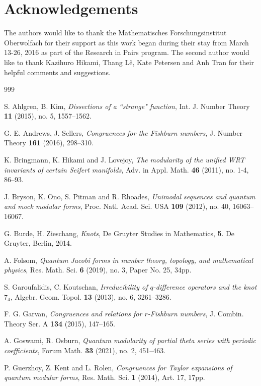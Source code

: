 \documentclass[11pt,reqno]{amsart}
\theoremstyle{definition}
\numberwithin{equation}{section}
\begin{document}
\section*{Acknowledgements}
The authors would like to thank the Mathematisches Forschungsinstitut Oberwolfach for their support as this work began during their stay from March 13-26, 2016 as part of the Research in Pairs program. The second author would like to thank Kazihuro Hikami, Thang L{\^e}, Kate Petersen and Anh Tran for their helpful comments and suggestions.

\begin{thebibliography}{999}

S. Ahlgren, B. Kim, \emph{Dissections of a ``strange" function}, Int. J. Number Theory \textbf{11} (2015), no. 5, 1557--1562.

G. E. Andrews, J. Sellers, \emph{Congruences for the Fishburn numbers}, J. Number Theory \textbf{161} (2016), 298--310.

K. Bringmann, K. Hikami and J. Lovejoy, \emph{The modularity of the unified WRT invariants of certain Seifert manifolds}, Adv. in Appl. Math. \textbf{46} (2011), no. 1-4, 86--93.

J. Bryson, K. Ono, S. Pitman and R. Rhoades, \emph{Unimodal sequences and quantum and mock modular forms}, Proc. Natl. Acad. Sci. USA \textbf{109} (2012), no. 40, 16063--16067.

G. Burde, H. Zieschang, \emph{Knots}, De Gruyter Studies in Mathematics, \textbf{5}. De Gruyter, Berlin, 2014.

A. Folsom, \emph{Quantum Jacobi forms in number theory, topology, and mathematical physics}, Res. Math. Sci. \textbf{6} (2019), no. 3, Paper No. 25, 34pp.

S. Garoufalidis, C. Koutschan, \emph{Irreducibility of $q$-difference operators and the knot $7_4$}, Algebr. Geom. Topol. {\bf 13} (2013), no. 6, 3261--3286.

F. G. Garvan, \emph{Congruences and relations for $r$-Fishburn numbers}, J. Combin. Theory Ser. A \textbf{134} (2015), 147--165.

A. Goswami, R. Osburn, \emph{Quantum modularity of partial theta series with periodic coefficients}, Forum Math. \textbf{33} (2021), no. 2, 451--463.

P. Guerzhoy, Z. Kent and L. Rolen, \emph{Congruences for Taylor expansions of quantum modular forms}, Res. Math. Sci. \textbf{1} (2014), Art. 17, 17pp.


\end{thebibliography}
\end{document}
